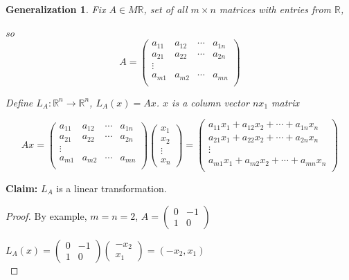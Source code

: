 \documentclass[12pt]{article}
\theoremstyle{plain}
\newtheorem{generalization}{Generalization}[subsection]
\newcommand{\mR}{{\mathbb{R}}}
\begin{document}
	\begin{generalization}
		Fix $A \in M \mR$, set of all $m\times n$ matrices with entries 
		from $\mR$, 

		so 
		\[
			A = 
			\begin{pmatrix}
				a_{11} & a_{12} & \cdots & a_{1n}\\
				a_{21} & a_{22} & \cdots & a_{2n}\\
				\vdots\\
				a_{m1} & a_{m2} & \cdots & a_{mn}\\
			\end{pmatrix}
		\]

		Define $L_A : \mR^n \to \mR^n$, $L_A(x) = Ax$. $x$ 
		is a column vector $nx_1$ matrix

		\[
			Ax = \begin{pmatrix}
				a_{11} & a_{12} & \cdots & a_{1n}\\
				a_{21} & a_{22} & \cdots & a_{2n}\\
				\vdots\\
				a_{m1} & a_{m2} & \cdots & a_{mn}\\
			\end{pmatrix}
			\begin{pmatrix}
				x_1\\
				x_2\\
				\vdots\\
				x_n
			\end{pmatrix}
			= \begin{pmatrix}
				a_{11}x_1 + a_{12} x_2 + \cdots + a_{1n}x_n\\
				a_{21}x_1 + a_{22} x_2 + \cdots + a_{2n}x_n\\
				\vdots\\
				a_{m1}x_1 + a_{m2} x_2 + \cdots + a_{mn}x_n\\
			\end{pmatrix}
		\]
	\end{generalization}

	\textbf{Claim: } $L_A$ is a linear transformation.
	\begin{proof}
		By example, $m = n = 2$, $A = \begin{pmatrix}
			0 & -1 \\
			1 & 0
		\end{pmatrix}$
		
		$L_A(x) = \begin{pmatrix}
			0 & -1 \\
			1 & 0
		\end{pmatrix}
		\begin{pmatrix}
			-x_2\\
			x_1
		\end{pmatrix}
		=(-x_2,x_1)$\\
	\end{proof}
	
\end{document}
